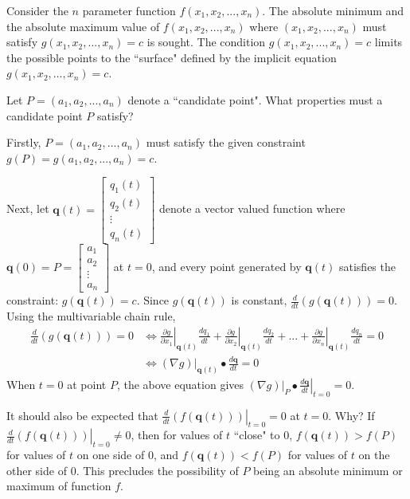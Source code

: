 \documentclass{article}
\begin{document}
Consider the \(n\) parameter function \(f(x_1, x_2, ..., x_n)\). The absolute minimum and the absolute maximum value of \(f(x_1, x_2, ..., x_n)\) where \((x_1, x_2, ..., x_n)\) must satisfy \(g(x_1, x_2, ..., x_n) = c\) is sought. The condition \(g(x_1, x_2, ..., x_n) = c\) limits the possible points to the ``surface" defined by the implicit equation \(g(x_1, x_2, ..., x_n) = c\).

Let \(P = (a_1, a_2, ..., a_n)\) denote a ``candidate point". What properties must a candidate point \(P\) satisfy? 

Firstly, \(P = (a_1, a_2, ..., a_n)\) must satisfy the given constraint \(g(P) = g(a_1, a_2, ..., a_n) = c\). 

Next, let \(\mathbf{q}(t) = \begin{bmatrix} q_1(t) \\ q_2(t) \\ \vdots \\ q_n(t) \end{bmatrix}\) denote a vector valued function where \(\mathbf{q}(0) = P = \begin{bmatrix} a_1 \\ a_2 \\ \vdots \\ a_n \end{bmatrix}\) at \(t = 0\), and every point generated by \(\mathbf{q}(t)\) satisfies the constraint: \(g(\mathbf{q}(t)) = c\). Since \(g(\mathbf{q}(t))\) is constant, \(\frac{d}{dt}(g(\mathbf{q}(t))) = 0\). Using the multivariable chain rule, 
\begin{align*} 
\frac{d}{dt}(g(\mathbf{q}(t))) = 0 & \iff \left.\frac{\partial g}{\partial x_1}\right|_{\mathbf{q}(t)}\frac{dq_1}{dt} + \left.\frac{\partial g}{\partial x_2}\right|_{\mathbf{q}(t)}\frac{dq_2}{dt} + ... + \left.\frac{\partial g}{\partial x_n}\right|_{\mathbf{q}(t)}\frac{dq_n}{dt} = 0 \\
& \iff (\nabla g)\Big|_{\mathbf{q}(t)} \bullet \frac{d\mathbf{q}}{dt} = 0
\end{align*}
When \(t = 0\) at point \(P\), the above equation gives \((\nabla g)\Big|_{P} \bullet \left.\frac{d\mathbf{q}}{dt}\right|_{t = 0} = 0\). 

It should also be expected that \(\left.\frac{d}{dt}(f(\mathbf{q}(t)))\right|_{t = 0} = 0\) at \(t = 0\). Why? If \(\left.\frac{d}{dt}(f(\mathbf{q}(t)))\right|_{t = 0} \neq 0\), then for values of \(t\) ``close" to \(0\), \(f(\mathbf{q}(t)) > f(P)\) for values of \(t\) on one side of \(0\), and \(f(\mathbf{q}(t)) < f(P)\) for values of \(t\) on the other side of \(0\). This precludes the possibility of \(P\) being an absolute minimum or maximum of function \(f\). 
\end{document}
